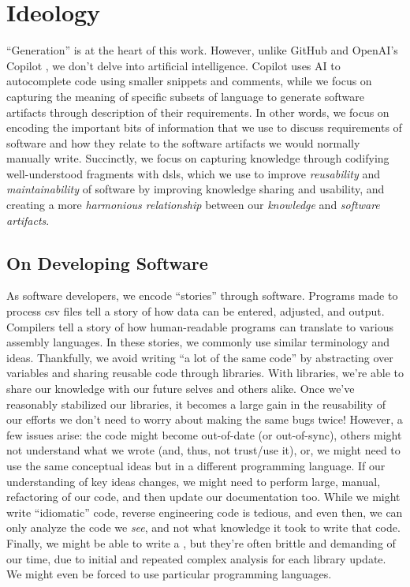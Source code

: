 \chapter[Ideology]{Ideology\footnotemark}
\label{chap:ideology}

``Generation'' is at the heart of this work. However, unlike GitHub and OpenAI's
Copilot \cite{Copilot}, we don't delve into artificial intelligence. Copilot
uses AI to autocomplete code using smaller snippets and comments, while we focus
on capturing the meaning of specific subsets of language to generate software
artifacts through description of their requirements. In other words, we focus on
encoding the important bits of information that we use to discuss requirements
of software and how they relate to the software artifacts we would normally
manually write. Succinctly, we focus on capturing knowledge through codifying
well-understood fragments with \aclp{dsl}, which we use to improve
\textit{reusability} and \textit{maintainability} of software by improving
knowledge sharing and usability, and creating a more \textit{harmonious
relationship} between our \textit{knowledge} and \textit{software artifacts}.

\section{On Developing Software}
\label{chap:ideology:sec:on_developing_software}

As software developers, we encode ``stories'' through software. Programs made to
process \acs{csv} files tell a story of how data can be entered, adjusted, and
output. Compilers tell a story of how human-readable programs can translate to
various assembly languages. In these stories, we commonly use similar
terminology and ideas. Thankfully, we avoid writing ``a lot of the same code''
by abstracting over variables and sharing reusable code through libraries. With
libraries, we're able to share our knowledge with our future selves and others
alike. Once we've reasonably stabilized our libraries, it becomes a large gain
in the reusability of our efforts \textemdash we don't need to worry about
making the same bugs twice! However, a few issues arise: the code might become
out-of-date (or out-of-sync), others might not understand what we wrote (and,
thus, not trust/use it), or, we might need to use the same conceptual ideas but
in a different programming language. If our understanding of key ideas changes,
we might need to perform large, manual, refactoring of our code, and then update
our documentation too. While we might write ``idiomatic'' code, reverse
engineering code is tedious, and even then, we can only analyze the code we
\textit{see}, and not what knowledge it took to write that code. Finally, we
might be able to write a , but they're often brittle and demanding of
our time, due to initial and repeated complex analysis for each library update.
We might even be forced to use particular programming languages.

